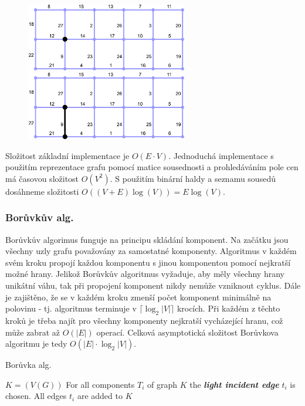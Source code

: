 \begin{figure}[h]
    \begin{center}
        \includegraphics[width=70mm]{02/images/prim01}
        \hspace{10px}
        \includegraphics[width=70mm]{02/images/prim02}
    \end{center}
\end{figure}
\vspace{-10px}

Složitost základní implementace je $O(E\cdot V)$. Jednoduchá implementace s použitím reprezentace grafu pomocí matice sousednosti a prohledáváním pole cen má časovou složitost $O(V^2)$. S použitím binární haldy a seznamu sousedů dosáhneme složitosti $O((V + E) \log(V)) = E \log(V)$.


\subsubsection{Borůvkův alg.}
Borůvkův algorimus funguje na principu skládání komponent. Na začátku jsou všechny uzly grafu považovány za samostatné komponenty. Algoritmus v každém svém kroku propojí každou komponentu s jinou komponentou pomocí nejkratší možné hrany. Jelikož Borůvkův algoritmus vyžaduje, aby měly všechny hrany unikátní váhu, tak při propojení komponent nikdy nemůže vzniknout cyklus. Dále je zajištěno, že se v každém kroku zmenší počet komponent minimálně na polovinu - tj. algoritmus terminuje v $\lceil \log_{2} \vert V \vert \rceil$ krocích. Při každém z těchto kroků je třeba najít pro všechny komponenty nejkratší vycházející hranu, což může zabrat až $O(\vert E \vert)$ operací. Celková asymptotická složitost Borůvkova algoritmu je tedy $O(\vert E\vert \cdot \log_{2} \vert V \vert)$.

\begin{algorithm}
\caption{Borůvka alg.}
\begin{algorithmic}
\State $K=(V(G))$
  \State For all components $T_i$ of graph $K$ the \textbf{\textit{light incident edge}} $t_i$ is chosen.
  \State All edges $t_i$ are added to $K$
\EndWhile
\end{algorithmic}
\end{algorithm}


